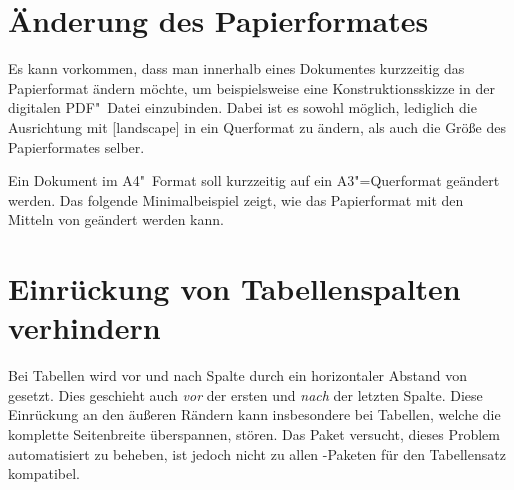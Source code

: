 \section{Änderung des Papierformates}
Es kann vorkommen, dass man innerhalb eines Dokumentes kurzzeitig das 
Papierformat ändern möchte, um beispielsweise eine Konstruktionsskizze in der 
digitalen PDF"~Datei einzubinden. Dabei ist es sowohl möglich, lediglich die 
Ausrichtung mit [landscape] in ein Querformat zu ändern, als 
auch die Größe des Papierformates selber.
%
\begin{Example}
Ein Dokument im A4"~Format soll kurzzeitig auf ein A3"=Querformat geändert 
werden. Das folgende Minimalbeispiel zeigt, wie das Papierformat mit den 
Mitteln von \KOMAScript{} geändert werden kann.
\end{Example}



\section{Einrückung von Tabellenspalten verhindern}%
\label{sec:tips:table}
Bei Tabellen wird vor und nach Spalte durch  ein horizontaler 
Abstand von  gesetzt. Dies geschieht auch \emph{vor} der 
ersten und \emph{nach} der letzten Spalte. Diese Einrückung an den äußeren 
Rändern kann insbesondere bei Tabellen, welche die komplette Seitenbreite 
überspannen, stören. Das Paket  versucht, dieses Problem 
automatisiert zu beheben, ist jedoch nicht zu allen -Paketen für 
den Tabellensatz kompatibel.


